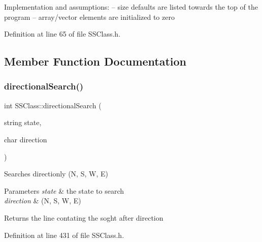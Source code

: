 Implementation and assumptions\+: -- size defaults are listed towards the top of the program -- array/vector elements are initialized to zero 

Definition at line 65 of file S\+S\+Class.\+h.



\subsection{Member Function Documentation}
\mbox{\label{classSSClass_ad03c99840c2946a2112f5f1942c287f2}} 
\subsubsection{\texorpdfstring{directional\+Search()}{directionalSearch()}}
{\footnotesize\ttfamily int S\+S\+Class\+::directional\+Search (\begin{DoxyParamCaption}\item[{string}]{state,  }\item[{char}]{direction }\end{DoxyParamCaption})}



Searches directionly (N, S, W, E) 


\begin{DoxyParams}{Parameters}
{\em state} & the state to search \\
\hline
{\em direction} & (N, S, W, E) \\
\hline
\end{DoxyParams}
\begin{DoxyReturn}{Returns}
the line contating the soght after direction 
\end{DoxyReturn}


Definition at line 431 of file S\+S\+Class.\+h.


